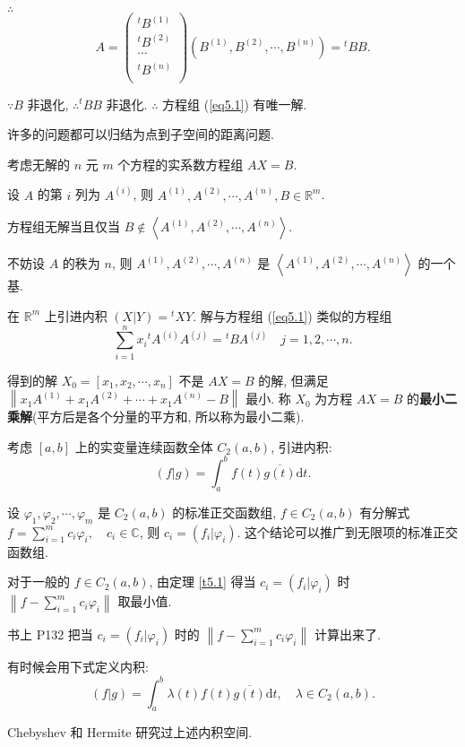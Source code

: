\documentclass[color=black,device=normal,lang=cn,mode=geye]{elegantnote}
\begin{document}
$\therefore$
\[A=\begin{pmatrix}
    {}^tB^{(1)} \\
    {}^tB^{(2)} \\
    \cdots \\
    {}^tB^{(n)} \\
\end{pmatrix}(B^{(1)},B^{(2)},\cdots,B^{(n)})={}^tBB.\]

$\because B$ 非退化, $\therefore{}^tBB$ 非退化. $\therefore$ 方程组 (\ref{eq5.1}) 有唯一解.

许多的问题都可以归结为点到子空间的距离问题.
\begin{example}\label{exa5.1}
    考虑无解的 $n$ 元 $m$ 个方程的实系数方程组 $AX=B$.
    
    设 $A$ 的第 $i$ 列为 $A^{(i)}$, 则 $A^{(1)},A^{(2)},\cdots,A^{(n)},B\in\mathbb{R}^m$.
    
    方程组无解当且仅当 $B\notin\left<A^{(1)},A^{(2)},\cdots,A^{(n)}\right>$.
    
    不妨设 $A$ 的秩为 $n$, 则 $A^{(1)},A^{(2)},\cdots,A^{(n)}$ 是 $\left<A^{(1)},A^{(2)},\cdots,A^{(n)}\right>$ 的一个基.

    在 $\mathbb{R}^m$ 上引进内积 $(X|Y)={}^tXY$. 解与方程组 (\ref{eq5.1}) 类似的方程组
    \[\sum\limits_{i=1}^nx_i{}^tA^{(i)}A^{(j)}={}^tBA^{(j)}\quad j=1,2,\cdots,n.\]
    
    得到的解 $X_0=[x_1,x_2,\cdots,x_n]$ 不是 $AX=B$ 的解, 但满足 $\left\|x_1A^{(1)}+x_1A^{(2)}+\cdots+x_1A^{(n)}-B\right\|$ 最小. 称 $X_0$ 为方程 $AX=B$ 的\textbf{最小二乘解}(平方后是各个分量的平方和, 所以称为最小二乘).
\end{example}
\begin{example}
    考虑 $[a,b]$ 上的实变量连续函数全体 $C_2(a,b)$, 引进内积:
    \[(f|g)=\int_a^bf(t)\overline{g(t)}\mathrm{d}t.\]
    
    设 $\varphi_1,\varphi_2,\cdots,\varphi_m$ 是 $C_2(a,b)$ 的标准正交函数组, $f\in C_2(a,b)$ 有分解式 $f=\sum\limits_{i=1}^mc_i\varphi_i,\quad c_i\in\mathbb{C}$, 则 $c_i=(f_i|\varphi_i)$. 这个结论可以推广到无限项的标准正交函数组.

    对于一般的 $f\in C_2(a,b)$, 由定理 \ref{t5.1} 得当 $c_i=(f_i|\varphi_i)$ 时 $\left\|f-\sum\limits_{i=1}^mc_i\varphi_i\right\|$ 取最小值.

    书上 P132 把当 $c_i=(f_i|\varphi_i)$ 时的 $\left\|f-\sum\limits_{i=1}^mc_i\varphi_i\right\|$ 计算出来了.

    有时候会用下式定义内积:
    \[(f|g)=\int_a^b\lambda(t)f(t)\overline{g(t)}\mathrm{d}t,\quad\lambda\in C_2(a,b).\]

    Chebyshev 和 Hermite 研究过上述内积空间.
\end{example}
\end{document}
